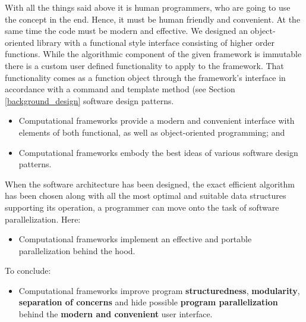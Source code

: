 \quad With all the things said above it is human programmers, who are going to use the concept in the end. Hence, it must be human friendly and convenient. At the same time the code must be modern and effective. We designed an object-oriented library with a functional style interface consisting of higher order functions. While the algorithmic component of the given framework is immutable there is a custom user defined functionality to apply to the framework. That functionality comes as a function object through the framework's interface in accordance with a command and template method (see Section \ref{background_design} software design patterns. 
\begin{itemize}[style=unboxed,leftmargin=0cm]
\itemsep0em
\renewcommand\labelitemi{$\vartriangleright$}
\renewcommand\labelitemii{$\bullet$}
\item Computational frameworks provide a modern and convenient interface with elements of both functional, as well as object-oriented programming; and
\item Computational frameworks embody the best ideas of various software design patterns. 
\end{itemize}
\quad When the software architecture has been designed, the exact efficient algorithm has been chosen along with all the most optimal and suitable data structures supporting its operation, a programmer can move onto the task of software parallelization. Here:  
\begin{itemize}[style=unboxed,leftmargin=0cm]
\itemsep0em
\renewcommand\labelitemi{$\vartriangleright$}
\renewcommand\labelitemii{$\bullet$}
\item Computational frameworks implement an effective and portable parallelization behind the hood.
\end{itemize}
\quad To conclude:
\begin{itemize}[style=unboxed,leftmargin=0cm]
\itemsep0em
\renewcommand\labelitemi{$\vartriangleright$}
\renewcommand\labelitemii{$\bullet$}
\item Computational frameworks improve program \textbf{structuredness}, \textbf{modularity}, \textbf{separation of concerns} and hide possible \textbf{program parallelization} behind the \textbf{modern and convenient} user interface. 
\end{itemize}
